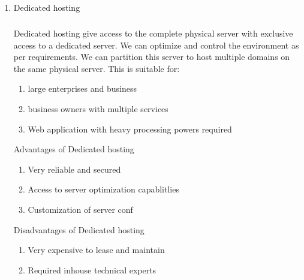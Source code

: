 \documentclass[11pt]{article}
\begin{document}
\begin{enumerate}
    \item Dedicated hosting
    \subparagraph{}
    Dedicated hosting give access to the complete physical server with exclusive access to a dedicated server. We can optimize and control the environment as per requirements. We can partition this server to host multiple domains on the same physical server.
    This is suitable for:
    \begin{enumerate}
        \item large enterprises and business
        \item business owners with multiple services
        \item Web application with heavy processing powers required
    \end{enumerate}
    \subitem Advantages of Dedicated hosting
    \begin{enumerate}
        \item Very reliable and secured
        \item Access to server optimization capablitlies
        \item Customization of server conf
    \end{enumerate}
    \subitem Disadvantages of Dedicated hosting
    \begin{enumerate}
        \item Very expensive to lease and maintain
        \item Required inhouse technical experts
    \end{enumerate}


\end{enumerate}
\end{document}
